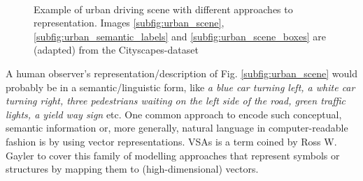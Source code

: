 \begin{figure}[t!]
	\centering
	\\
	\caption{Example of urban driving scene with different approaches to representation. Images \ref{subfig:urban_scene}, \ref{subfig:urban_semantic_labels} and \ref{subfig:urban_scene_boxes} are (adapted) from the Cityscapes-dataset \cite{Cordts2016}}\label{fig:urban_scene}
\end{figure}
A human observer's representation/description of Fig. \ref{subfig:urban_scene} would probably be in a semantic/linguistic form, like \emph{a blue car turning left, a white car turning right, three pedestrians waiting on the left side of the road, green traffic lights, a yield way sign} etc.
One common approach to encode such conceptual, semantic information or, more generally, natural language in computer-readable fashion is by using vector representations.
\acfp{VSA} is a term coined by Ross W. Gayler \cite{Gayler2003} to cover this family of modelling approaches that represent symbols or structures by mapping them to (high-dimensional) vectors.

